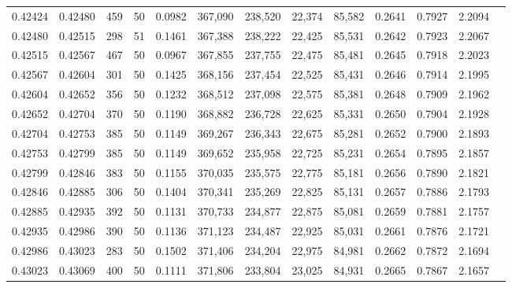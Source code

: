 \begin{tabular}{rrrrrrrrrrrrr}
0.42424 & 0.42480 &   459 &  50 &                                     0.0982 & 367,090 & 238,520 &  22,374 &  85,582 & 0.2641 & 0.7927 & 2.2094 \\
0.42480 & 0.42515 &   298 &  51 &                                     0.1461 & 367,388 & 238,222 &  22,425 &  85,531 & 0.2642 & 0.7923 & 2.2067 \\
0.42515 & 0.42567 &   467 &  50 &                                     0.0967 & 367,855 & 237,755 &  22,475 &  85,481 & 0.2645 & 0.7918 & 2.2023 \\
0.42567 & 0.42604 &   301 &  50 &                                     0.1425 & 368,156 & 237,454 &  22,525 &  85,431 & 0.2646 & 0.7914 & 2.1995 \\
0.42604 & 0.42652 &   356 &  50 &                                     0.1232 & 368,512 & 237,098 &  22,575 &  85,381 & 0.2648 & 0.7909 & 2.1962 \\
0.42652 & 0.42704 &   370 &  50 &                                     0.1190 & 368,882 & 236,728 &  22,625 &  85,331 & 0.2650 & 0.7904 & 2.1928 \\
0.42704 & 0.42753 &   385 &  50 &                                     0.1149 & 369,267 & 236,343 &  22,675 &  85,281 & 0.2652 & 0.7900 & 2.1893 \\
0.42753 & 0.42799 &   385 &  50 &                                     0.1149 & 369,652 & 235,958 &  22,725 &  85,231 & 0.2654 & 0.7895 & 2.1857 \\
0.42799 & 0.42846 &   383 &  50 &                                     0.1155 & 370,035 & 235,575 &  22,775 &  85,181 & 0.2656 & 0.7890 & 2.1821 \\
0.42846 & 0.42885 &   306 &  50 &                                     0.1404 & 370,341 & 235,269 &  22,825 &  85,131 & 0.2657 & 0.7886 & 2.1793 \\
0.42885 & 0.42935 &   392 &  50 &                                     0.1131 & 370,733 & 234,877 &  22,875 &  85,081 & 0.2659 & 0.7881 & 2.1757 \\
0.42935 & 0.42986 &   390 &  50 &                                     0.1136 & 371,123 & 234,487 &  22,925 &  85,031 & 0.2661 & 0.7876 & 2.1721 \\
0.42986 & 0.43023 &   283 &  50 &                                     0.1502 & 371,406 & 234,204 &  22,975 &  84,981 & 0.2662 & 0.7872 & 2.1694 \\
0.43023 & 0.43069 &   400 &  50 &                                     0.1111 & 371,806 & 233,804 &  23,025 &  84,931 & 0.2665 & 0.7867 & 2.1657 \\

\end{tabular}
